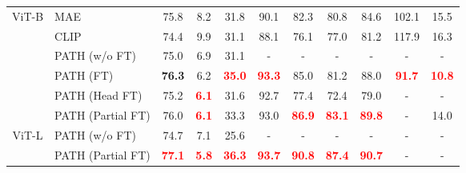 \documentclass[10pt,twocolumn,letterpaper]{article}
\begin{document}
\begin{table*}[htbp]
\begin{minipage}[t]{0.996\textwidth}
{\begin{tabular}{cl|ccccccc|cc}
    \midrule
    \multirow{6}[4]{*}{ViT-B} & MAE   & 75.8  & 8.2   & 31.8  & \cellcolor[rgb]{ .949,  .949,  .949} 90.1  & 82.3  & 80.8  & \cellcolor[rgb]{ .949,  .949,  .949} 84.6  &  102.1  &  15.5 \\
          & CLIP  & 74.4  & 9.9   & 31.1  & \cellcolor[rgb]{ .949,  .949,  .949} 88.1  & 76.1  & 77.0  & \cellcolor[rgb]{ .949,  .949,  .949} 81.2  &  117.9  & 16.3 \\
\cmidrule{2-11}          & PATH (w/o FT) & 75.0  & 6.9   & 31.1  & \cellcolor[rgb]{ .949,  .949,  .949} -  & -   & -   & \cellcolor[rgb]{ .949,  .949,  .949} - &  - &  - \\
          & PATH (FT) & \textbf{76.3}  & 6.2   & \textcolor{red}{\textbf{35.0}}  & \cellcolor[rgb]{ .949,  .949,  .949} \textcolor{red}{\textbf{93.3}}  & 85.0  & 81.2  & \cellcolor[rgb]{ .949,  .949,  .949} 88.0  &  \textcolor{red}{\textbf{91.7}}  &  \textcolor{red}{\textbf{10.8}} \\
& PATH (Head FT) & 75.2  & \textcolor{red}{\textbf{6.1}}   & 31.6  & \cellcolor[rgb]{ .949,  .949,  .949} 92.7  & 77.4  & 72.4  & \cellcolor[rgb]{ .949,  .949,  .949} 79.0  &  - &  - \\
          & PATH (Partial FT) & 76.0  & \textcolor{red}{\textbf{6.1}}   & 33.3  & \cellcolor[rgb]{ .949,  .949,  .949} 93.0  & \textcolor{red}{\textbf{86.9}}  & \textcolor{red}{\textbf{83.1}}  & \cellcolor[rgb]{ .949,  .949,  .949} \textcolor{red}{\textbf{89.8}}  &  - &  14.0 \\
\cmidrule{1-11}    \multirow{2}[2]{*}{ViT-L} & PATH (w/o FT) & 74.7  & 7.1   & 25.6  & \cellcolor[rgb]{ .949,  .949,  .949} - & -   & -   & \cellcolor[rgb]{ .949,  .949,  .949} - &  - &  - \\
          & PATH (Partial FT) & \textcolor{red}{\textbf{77.1}}  & \textcolor{red}{\textbf{5.8}}   & \textcolor{red}{\textbf{36.3}}  & \cellcolor[rgb]{ .949,  .949,  .949} \textcolor{red}{\textbf{93.7}}  & \textcolor{red}{\textbf{90.8}}  & \textcolor{red}{\textbf{87.4}}  & \cellcolor[rgb]{ .949,  .949,  .949} \textcolor{red}{\textbf{90.7}}  &  - &  -\\
    \bottomrule
    \end{tabular}}
  \end{minipage}
  \label{tab_main_res}
\end{table*}
\end{document}
